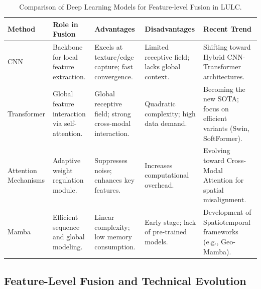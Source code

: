\documentclass[]{interact}
\theoremstyle{plain}%
\theoremstyle{definition}
\theoremstyle{remark}
\begin{document}

\begin{table}[htb!]
	\centering
	\setlength{\belowcaptionskip}{5pt}
	\caption{Comparison of Deep Learning Models for Feature-level Fusion in LULC.}
	\label{tab:comparison_models}
	\footnotesize
	\renewcommand{\arraystretch}{1.4} %
	\begin{tabular}{@{} p{1.8cm} p{2.8cm} p{3.3cm} p{3.1cm} p{3.5cm} @{}}
		\toprule
		\textbf{Method} & \textbf{Role in Fusion} & \textbf{Advantages} & \textbf{Disadvantages} & \textbf{Recent Trend} \\ 
		\midrule
		CNN \citep{2, 8, 29, 56} & Backbone for local feature extraction. & Excels at texture/edge capture; fast convergence. & Limited receptive field; lacks global context. & Shifting toward Hybrid CNN-Transformer architectures. \\ 
		\addlinespace[0.8em] %
		
		Transformer \citep{7, 35, 36, bazi2021vision, liu2024softformer} & Global feature interaction via self-attention. & Global receptive field; strong cross-modal interaction. & Quadratic complexity; high data demand. & Becoming the new SOTA; focus on efficient variants (Swin, SoftFormer). \\ 
		\addlinespace[0.8em]
		
		Attention Mechanisms \citep{46, 47, zhang2023multimodal} & Adaptive weight regulation module. & Suppresses noise; enhances key features. & Increases computational overhead. & Evolving toward Cross-Modal Attention for spatial misalignment. \\ 
		\addlinespace[0.8em]
		
		Mamba \citep{5, 49, 53, he2024foundation} & Efficient sequence and global modeling. & Linear complexity; low memory consumption. & Early stage; lack of pre-trained models. & Development of Spatiotemporal frameworks (e.g., Geo-Mamba). \\ 
		\bottomrule
	\end{tabular}
\end{table}

\subsection{Feature-Level Fusion and Technical Evolution}
\end{document}
